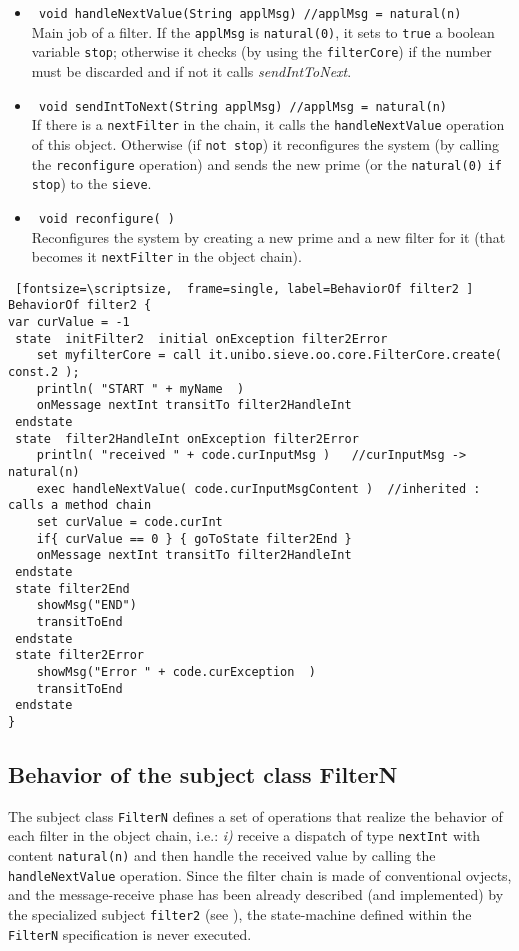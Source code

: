 \documentclass{../llncs}
\begin{document}
\begin{itemize}
\item \texttt{ void  handleNextValue(String applMsg) //applMsg = natural(n) }\\
\noindent
Main job of a filter. If the \texttt{applMsg} is \texttt{natural(0)}, it sets to \texttt{true} a boolean variable \texttt{stop}; otherwise it checks (by using the \texttt{filterCore}) if the number must be discarded and if not it calls \textit{sendIntToNext}.
\medskip 
\item \texttt{ void sendIntToNext(String applMsg) //applMsg = natural(n) }\\
\noindent
If there is a \texttt{nextFilter} in the chain, it calls the \texttt{handleNextValue} operation of this object. Otherwise (if \texttt{not stop}) it reconfigures the system (by calling the \texttt{reconfigure} operation) and sends the new prime (or the \texttt{natural(0)} \texttt{if stop}) to the \texttt{sieve}.
\medskip 
\item \texttt{ void reconfigure( )  }\\
\noindent
Reconfigures the system by creating a new prime and a new filter for it (that becomes it \texttt{nextFilter} in the object chain).
\end{itemize}

\begin{Verbatim} [fontsize=\scriptsize,  frame=single, label=BehaviorOf filter2 ] 
BehaviorOf filter2 { 
var curValue = -1
 state  initFilter2  initial onException filter2Error
	set myfilterCore = call it.unibo.sieve.oo.core.FilterCore.create( const.2 );  
	println( "START " + myName	)
	onMessage nextInt transitTo filter2HandleInt 
 endstate 	  	
 state  filter2HandleInt onException filter2Error
	println( "received " + code.curInputMsg )	//curInputMsg -> natural(n)
	exec handleNextValue( code.curInputMsgContent )  //inherited : calls a method chain
	set curValue = code.curInt
	if{ curValue == 0 } { goToState filter2End }
	onMessage nextInt transitTo filter2HandleInt
 endstate 		
 state filter2End
	showMsg("END")
	transitToEnd
 endstate
 state filter2Error
	showMsg("Error " + code.curException  ) 
	transitToEnd
 endstate
}
\end{Verbatim}

\subsection{Behavior of the subject class FilterN}
The subject class \texttt{FilterN} defines a set of operations that realize the behavior of each filter in the object chain, i.e.:  \textit{i)} receive a dispatch of type \texttt{nextInt} with content \texttt{natural(n)} and then handle the received value by calling the \texttt{handleNextValue} operation. Since the filter chain is made of conventional ovjects, and the message-receive phase has been already described (and implemented) by the specialized subject \texttt{filter2} (see ), the state-machine defined within the \texttt{FilterN} specification is never executed.
\end{document}
